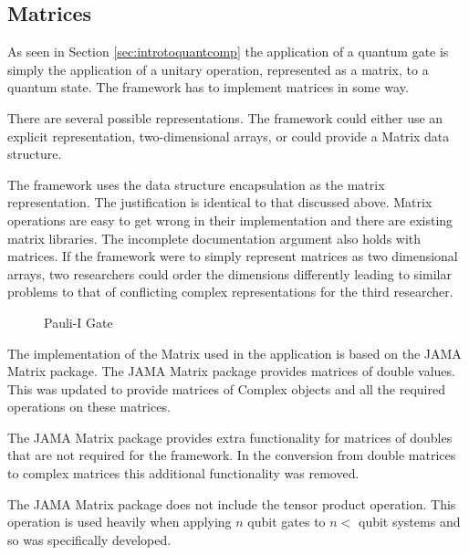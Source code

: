 \subsection{Matrices}
As seen in Section \ref{sec:introtoquantcomp} the application of a quantum gate is simply the application of a unitary operation, represented as a matrix, to a quantum state.
The framework has to implement matrices in some way.

There are several possible representations.
The framework could either use an explicit representation, two-dimensional arrays, or could provide a Matrix data structure.

The framework uses the data structure encapsulation as the matrix representation.
The justification is identical to that discussed above.
Matrix operations are easy to get wrong in their implementation and there are existing matrix libraries.
The incomplete documentation argument also holds with matrices.
If the framework were to simply represent matrices as two dimensional arrays, two researchers could order the dimensions differently leading to similar problems to that of conflicting complex representations for the third researcher.

\lstset{language = XML,
basicstyle=\footnotesize,
breakatwhitespace=false,
numbers=none,
breaklines=true}
\begin{figure}
\begin{center}
\hspace{20pt}
\end{center}
\caption{Pauli-I Gate}
\label{code:pauliixmldef}
\end{figure}

The implementation of the Matrix used in the application is based on the JAMA Matrix package\cite{javamatrix}.
The JAMA Matrix package provides matrices of double values.
This was updated to provide matrices of Complex objects and all the required operations on these matrices.

The JAMA Matrix package provides extra functionality for matrices of doubles that are not required for the framework.
In the conversion from double matrices to complex matrices this additional functionality was removed.

The JAMA Matrix package does not include the tensor product operation.
This operation is used heavily when applying $n$ qubit gates to $n<$ qubit systems and so was specifically developed.

